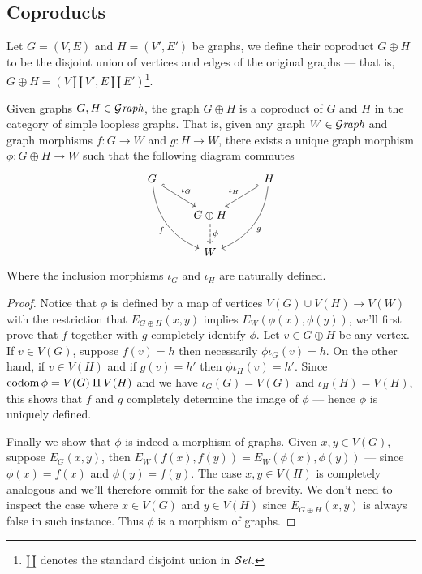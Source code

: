 \subsection{Coproducts}

\begin{definition}[Coproduct]\label{def: coprod-graph}
  Let \(G = (V, E)\) and \(H = (V', E')\) be graphs, we define their coproduct
  \(G \oplus H\) to be the disjoint union of vertices and edges of the original
  graphs --- that is, \(G \oplus H = (V \amalg V', E \amalg
  E')\)\footnote{\(\amalg\) denotes the standard disjoint union in \({\mathcal{S}\textit{et}}\).}.
\end{definition}

\begin{proposition}
  \label{prop: coprod-graph}
  Given graphs \(G, H \in {\mathcal{G}\textit{raph}}\), the graph \(G \oplus H\) is a coproduct of
  \(G\) and \(H\) in the category of simple loopless graphs. That is, given any
  graph \(W \in {\mathcal{G}\textit{raph}}\) and graph morphisms \(f: G \to W\) and \(g: H \to W\),
  there exists a unique graph morphism \(\phi: G \oplus H \to W\) such that the
  following diagram commutes
  \[
    \begin{tikzcd}
      G \ar[dr, hook, "\iota_G"] \ar[ddr, swap, bend right, "f"]
      & &H \ar[dl, swap, hook', "\iota_{H}"] \ar[ddl, bend left, "g"]
      \\
      &G \oplus H \ar[d, dashed, "\phi"]
      \\
      &W &
    \end{tikzcd}
  \]
  Where the inclusion morphisms \(\iota_G\) and \(\iota_{H}\) are naturally
  defined.
\end{proposition}

\begin{proof}
  Notice that \(\phi\) is defined by a map of vertices \(V(G) \cup V(H) \to
  V(W)\) with the restriction that \(E_{G \oplus H}(x, y)\) implies
  \(E_W(\phi(x), \phi(y))\), we'll first prove that \(f\) together with \(g\)
  completely identify \(\phi\). Let \(v \in G \oplus H\) be any vertex. If \(v
  \in V(G)\), suppose \(f(v) = h\) then necessarily \(\phi \iota_G(v) = h\). On
  the other hand, if \(v \in V(H)\) and if \(g(v) = h'\) then \(\phi
  \iota_{H}(v) = h'\). Since \(\operatorname{codom} \phi = V(G) \amalg V(H)\) and we have
  \(\iota_G(G) = V(G)\) and \(\iota_{H}(H) = V(H)\), this shows that \(f\) and
  \(g\) completely determine the image of \(\phi\) --- hence \(\phi\) is
  uniquely defined.

  Finally we show that \(\phi\) is indeed a morphism of graphs. Given \(x, y \in
  V(G)\), suppose \(E_G(x, y)\), then \(E_W(f(x), f(y)) = E_W(\phi(x),
  \phi(y))\) --- since \(\phi(x) = f(x)\) and \(\phi(y) = f(y)\). The case \(x,
  y \in V(H)\) is completely analogous and we'll therefore ommit for the sake of
  brevity. We don't need to inspect the case where \(x \in V(G)\) and \(y \in
  V(H)\) since \(E_{G \oplus H}(x, y)\) is always false in such instance. Thus
  \(\phi\) is a morphism of graphs.
\end{proof}

